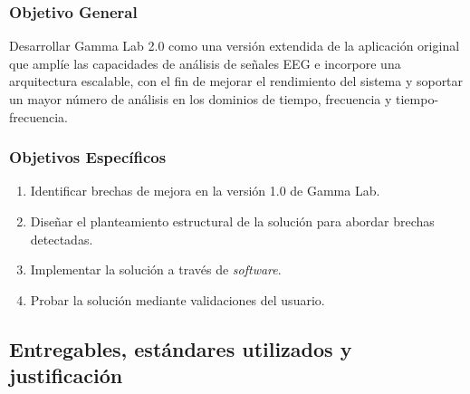 \documentclass[12pt,letterpaper,oneside]{article}
\begin{document}
\subsubsection{Objetivo General}
Desarrollar Gamma Lab 2.0 como una versión extendida de la aplicación original que amplíe
las capacidades de análisis de señales EEG e incorpore una arquitectura escalable, con el
fin de mejorar el rendimiento del sistema y soportar un mayor número de análisis en los
dominios de tiempo, frecuencia y tiempo-frecuencia.

\subsubsection{Objetivos Específicos}
\begin{enumerate}
  \item Identificar brechas de mejora en la versión 1.0 de Gamma Lab.
  \item Diseñar el planteamiento estructural de la solución para abordar brechas detectadas.
  \item Implementar la solución a través de \textit{software}.
  \item Probar la solución mediante validaciones del usuario.
\end{enumerate}

\subsection{Entregables, estándares utilizados y justificación}
\end{document}
